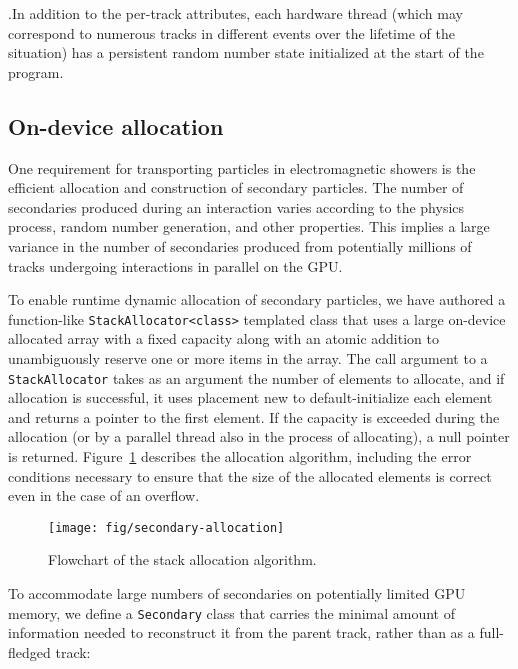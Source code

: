 .In addition to the per-track attributes, each hardware thread
(which may correspond to numerous tracks in different events over the lifetime
of the situation) has a persistent random number state initialized at the start
of the program.

\subsection{On-device allocation}\label{on-device-allocation}

One requirement for transporting particles in electromagnetic showers is
the efficient allocation and construction of secondary particles. The
number of secondaries produced during an interaction varies according to
the physics process, random number generation, and other properties.
This implies a large variance in the number of secondaries produced from
potentially millions of tracks undergoing interactions in parallel on
the GPU.

To enable runtime dynamic allocation of secondary particles, we have
authored a function-like
\texttt{StackAllocator\textless{}class\textgreater{}} templated class
that uses a large on-device allocated array with a fixed capacity along
with an atomic addition to unambiguously reserve one or more items in
the array. The call argument to a \texttt{StackAllocator} takes as an
argument the number of elements to allocate, and if allocation is
successful, it uses placement new to default-initialize each element and
returns a pointer to the first element. If the capacity is exceeded
during the allocation (or by a parallel thread also in the process of
allocating), a null pointer is returned. Figure~\ref{fig:secondary} describes
the allocation algorithm, including the error conditions necessary to ensure
that the size of the allocated elements is correct even in the case of an
overflow.
%
\begin{figure}[htb]
  \centering
  \texttt{[image: fig/secondary-allocation]}
  \caption{Flowchart of the stack allocation algorithm.}
  \label{fig:secondary}
\end{figure}

To accommodate large numbers of secondaries on potentially limited GPU
memory, we define a \texttt{Secondary} class that carries the minimal
amount of information needed to reconstruct it from the parent track,
rather than as a full-fledged track:

\begin{Shaded}
\begin{Highlighting}[]
\NormalTok{\{}
\NormalTok{\};}
\end{Highlighting}
\end{Shaded}


